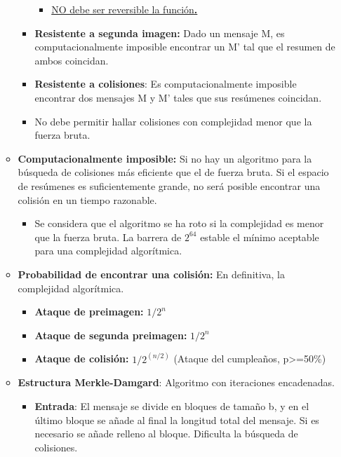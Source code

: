 \documentclass[12pt, twoside, openright]{report} %
\begin{document}
\begin{itemize}
\begin{itemize}
\begin{itemize}
			                  \begin{itemize}
				                  \item \underline{NO debe ser reversible la función\textbf{.}}
			                  \end{itemize}
			            \item \textbf{Resistente a segunda imagen:} Dado un mensaje M, es computacionalmente imposible encontrar un M' tal que el resumen de ambos coincidan.
			            \item \textbf{Resistente a colisiones}: Es computacionalmente imposible encontrar dos mensajes M y M' tales que sus resúmenes coincidan.
			            \item No debe permitir hallar colisiones con complejidad menor que la fuerza bruta.
		            \end{itemize}
		      \item \textbf{Computacionalmente imposible:} Si no hay un algoritmo para la búsqueda de colisiones más eficiente que el de fuerza bruta. Si el espacio de resúmenes es suficientemente grande, no será posible encontrar una colisión en un tiempo razonable.
		            \begin{itemize}
			            \item Se considera que el algoritmo se ha roto si la complejidad es menor que la fuerza bruta. La barrera de $2^{64}$ estable el mínimo aceptable para una complejidad algorítmica.
		            \end{itemize}
		      \item \textbf{Probabilidad de encontrar una colisión:} En definitiva, la complejidad algorítmica.
		            \begin{itemize}
			            \item \textbf{Ataque de preimagen:} $1/2^n$
			            \item \textbf{Ataque de segunda preimagen:} $1/2^n$
			            \item \textbf{Ataque de colisión:} $1/2^{(n/2)}$ (Ataque del cumpleaños, p\textgreater=50\%)
		            \end{itemize}
		      \item \textbf{Estructura Merkle-Damgard}: Algoritmo con iteraciones encadenadas.
		            \begin{itemize}
			            \item \textbf{Entrada}: El mensaje se divide en bloques de tamaño b, y en el último bloque se añade al final la longitud total del mensaje. Si es necesario se añade relleno al bloque. Dificulta la búsqueda de colisiones.

\end{itemize}
\end{itemize}
\end{itemize}
\end{document}

